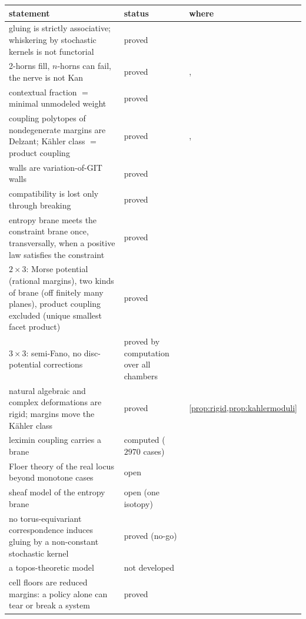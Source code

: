 \documentclass[11pt]{article}
\theoremstyle{definition}
\theoremstyle{remark}
\begin{document}
\begin{center}
\small
\begin{tabular}{p{7.2cm}p{2.2cm}p{5.4cm}}
\toprule
statement & status & where\\
\midrule
gluing is strictly associative; whiskering by stochastic kernels is not functorial & proved & \cite{Conditionals}\\
2-horns fill, $n$-horns can fail, the nerve is not Kan & proved & \cite[\S4]{Conditionals}, \cite[Prop.~6.2]{Bands}\\
contextual fraction $=$ minimal unmodeled weight & proved & \cite{Attribution}\\
coupling polytopes of nondegenerate margins are Delzant; Kähler class $=$ product coupling & proved & \cite[Thm.~6.4]{Conditionals}, \cite[Prop.~2.2]{Family}\\
walls are variation-of-GIT walls & proved & \cite[Prop.~10.5]{Conditionals}\\
compatibility is lost only through breaking & proved & \cite[Thm.~8.1]{Bands}\\
entropy brane meets the constraint brane once, transversally, when a positive law satisfies the constraint & proved & \cite[Thm.~3.1]{Bridges}\\
$2\times3$: Morse potential (rational margins), two kinds of brane (off finitely many planes), product coupling excluded (unique smallest
facet product) & proved & \cite[Thm.~8.2]{Bridges}\\
$3\times3$: semi-Fano, no disc-potential corrections & proved by computation over all chambers & \cite[Thm.~8.4]{Bridges}\\
natural algebraic and complex deformations are rigid; margins move the Kähler class & proved & \cref{prop:rigid,prop:kahlermoduli}\\
leximin coupling carries a brane & computed ($2970$ cases) & \cite[Thm.~8.2(iv)]{Bridges}\\
Floer theory of the real locus beyond monotone cases & open & \cite[\S8.4]{Bridges}\\
sheaf model of the entropy brane & open (one isotopy) & \cite[Prop.~8.7]{Bridges}\\
no torus-equivariant correspondence induces gluing by a non-constant stochastic kernel & proved (no-go) & \cite[Thm.~6.1]{Bridges}\\
a topos-theoretic model & not developed & \cite{IshamButterfield1998}\\
cell floors are reduced margins: a policy alone can tear or break a system & proved & \cite[Prop.~6.9]{Conditionals}\\

\end{tabular}
\end{center}
\end{document}
